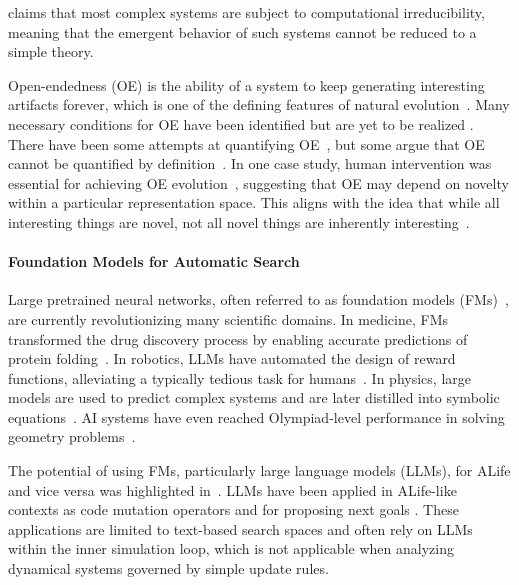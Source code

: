 \documentclass{article}
\begin{document}
\citet{wolfram2003new} claims that most complex systems are subject to computational irreducibility, meaning that the emergent behavior of such systems cannot be reduced to a simple theory.

Open-endedness (OE) is the ability of a system to keep generating interesting artifacts forever, which is one of the defining features of natural evolution~\citep{stanley2017open}.
Many necessary conditions for OE have been identified but are yet to be realized \citep{soros2014identifying}.
There have been some attempts at quantifying OE~\citep{hughes2024open, wang2020enhanced}, but some argue that OE cannot be quantified by definition~\citep{stepney2024open}.
In one case study, human intervention was essential for achieving OE evolution~\citep{secretan2011picbreeder}, suggesting that OE may depend on novelty within a particular representation space.
This aligns with the idea that while all interesting things are novel, not all novel things are inherently interesting~\citep{stanley2015greatness, schmidhuber1997interesting, herrmann2022learning}.


\paragraph{Foundation Models for Automatic Search}

Large pretrained neural networks, often referred to as foundation models (FMs)~\citep{bommasani2021opportunities, kaplan2020scaling}, are currently revolutionizing many scientific domains.
In medicine, FMs transformed the drug discovery process by enabling accurate predictions of protein folding~\citep{jumper2021highly}.
In robotics, LLMs have automated the design of reward functions, alleviating a typically tedious task for humans~\citep{ma2023eureka}.
In physics, large models are used to predict complex systems and are later distilled into symbolic equations~\citep{cranmer2020discovering}.
AI systems have even reached Olympiad-level performance in solving geometry problems~\citep{trinh2024solving}.



The potential of using FMs, particularly large language models (LLMs), for ALife and vice versa was highlighted in~\citet{nisioti2024text}.
LLMs have been applied in ALife-like contexts as code mutation operators \citep{lehman2023evolution, faldor2024omni} and for proposing next goals \citep{zhang2023omni, todd2023level}.
These applications are limited to text-based search spaces and often rely on LLMs within the inner simulation loop, which is not applicable when analyzing dynamical systems governed by simple update rules.
\end{document}
